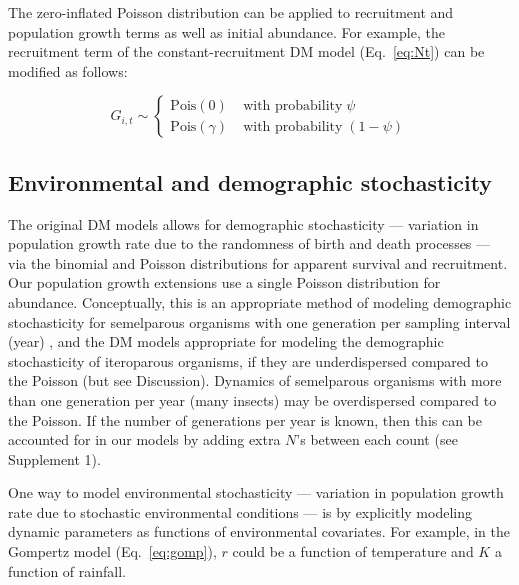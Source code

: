 \documentclass[12pt,english]{article}
\begin{document}
\begin{spacing}{1.9}
\begin{flushleft}
The zero-inflated Poisson distribution can be applied to recruitment and 
population growth terms as well as initial abundance. For example, 
the recruitment term of the constant-recruitment DM model
(Eq.~\ref{eq:Nt}) can be modified as follows:
\begin{linenomath*}
\begin{equation}
G_{i,t} \sim \left\{
\begin{aligned}
\mathrm{Pois}(0) &\; \text{with probability} \; \psi \\
\mathrm{Pois}(\gamma) &\; \text{with probability} \; (1-\psi)\end{aligned} \right.
\label{eq:ZIPts}
\end{equation}
\end{linenomath*}

\subsection*{Environmental and demographic stochasticity}
\label{subsec:stoch}
The original DM models allows for demographic stochasticity --- variation in population growth 
rate due to the randomness of birth and death processes --- 
via the binomial and Poisson distributions for apparent survival and recruitment.  Our population
growth extensions use a single Poisson distribution for abundance. 
Conceptually, this is an appropriate method of modeling demographic stochasticity 
 for semelparous organisms with one generation per sampling interval (year)
 \citep{bonsall_hastings:2004},
and the DM models appropriate for modeling the demographic stochasticity of iteroparous organisms,
if they are underdispersed compared to the Poisson (but see Discussion).
 Dynamics of semelparous organisms with more than one generation per year 
 (many insects) may be overdispersed compared to the Poisson.  If the number of generations per
 year is known, then this can be accounted for in our models by adding extra $N$'s between each
 count (see Supplement 1).

One way to model environmental stochasticity --- variation in population growth
rate due to stochastic environmental conditions --- is by explicitly
modeling dynamic parameters as functions of environmental covariates. 
For example, in the Gompertz model (Eq.~\ref{eq:gomp}), $r$ could be a 
function of temperature  
and $K$ a function of rainfall. 
 

\end{flushleft}
\end{spacing}
\end{document}
